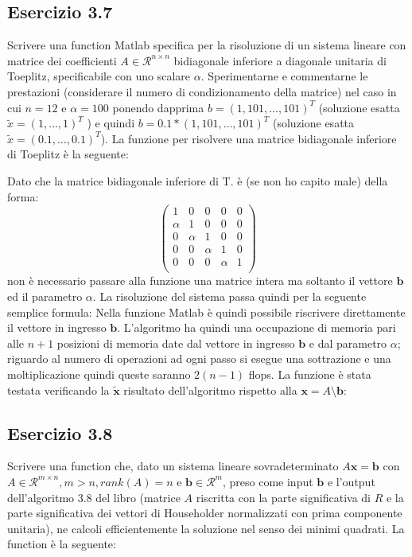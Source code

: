 	\subsection{Esercizio 3.7}
Scrivere una function Matlab specifica per la risoluzione di un sistema lineare con matrice dei coefficienti $A \in \mathcal{R}^{n \times n}$ bidiagonale inferiore a diagonale unitaria di Toeplitz, specificabile con uno scalare $\alpha$. Sperimentarne e commentarne le prestazioni (considerare il numero di condizionamento della matrice) nel caso in cui $n = 12$ e $\alpha =100$ ponendo dapprima $b = (1, 101, \dots , 101)^T$ (soluzione esatta $\tilde{x} = (1, \dots , 1)^T$ ) e quindi $b = 0.1 * (1, 101, \dots , 101)^T$ (soluzione esatta $\tilde{x} = (0.1, \dots , 0.1)^T$).
\PP
La funzione per risolvere una matrice bidiagonale inferiore di Toeplitz è la seguente:

Dato che la matrice bidiagonale inferiore di T. è (se non ho capito male) della forma:
\[
\begin{pmatrix}
	1&0&0&0&0\\
	\alpha&1&0&0&0\\
	0&\alpha&1&0&0\\
	0&0&\alpha&1&0\\
	0&0&0&\alpha&1\\
\end{pmatrix}
\]
non è necessario passare alla funzione una matrice intera ma soltanto il vettore $\mathbf{b}$ ed il parametro $\alpha$.
La risoluzione del sistema passa quindi per la seguente semplice formula: 
Nella funzione Matlab è quindi possibile riscrivere direttamente il vettore in ingresso $\mathbf{b}$.
L'algoritmo ha quindi una occupazione di memoria pari alle $n+1$ posizioni di memoria date dal vettore in ingresso $\mathbf{b}$ e dal parametro $\alpha$; riguardo al numero di operazioni ad ogni passo si esegue una sottrazione e una moltiplicazione quindi queste saranno $2(n-1)$ flops.
La funzione è stata testata verificando la $\mathbf{\tilde{x}}$ risultato dell'algoritmo rispetto alla $\mathbf{x} = A\setminus\mathbf{b}$:




	\subsection{Esercizio 3.8}

Scrivere una function che, dato un sistema lineare sovradeterminato $A\mathbf{x}=\mathbf{b}$ con $A \in \mathcal{R}^{m \times n}, m > n, rank(A) = n$ e $\mathbf{b} \in \mathcal{R}^m$, preso come input $\mathbf{b}$ e l'output dell'algoritmo 3.8 del libro (matrice $A$ riscritta con la parte significativa di $R$ e la parte significativa dei vettori di Householder normalizzati con prima componente unitaria), ne calcoli efficientemente la soluzione nel senso dei minimi quadrati.
\PP
La function è la seguente:


